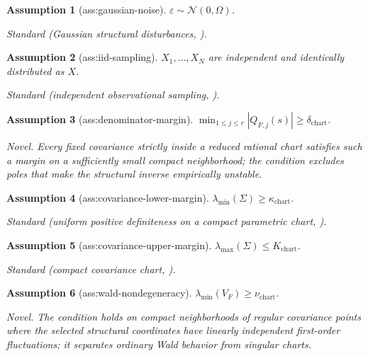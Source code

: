 \documentclass{article}
\newtheorem{assumption}{Assumption}
\begin{document}
\begin{assumption}[ass:gaussian-noise]\label{ass:gaussian-noise}
\(\varepsilon\sim\mathcal N(0,\Omega)\).
\par\smallskip\noindent\emph{Standard} (Gaussian structural disturbances, \cite{FoygelDraismaDrton2012}).
\end{assumption}

\begin{assumption}[ass:iid-sampling]\label{ass:iid-sampling}
\(X_1,\ldots,X_N\) are independent and identically distributed as \(X\).
\par\smallskip\noindent\emph{Standard} (independent observational sampling, \cite{MareisSturmaDrton2026}).
\end{assumption}

\begin{assumption}[ass:denominator-margin]\label{ass:denominator-margin}
\(\min_{1\le j\le r}|Q_{F,j}(s)|\ge\delta_{\mathrm{chart}}\).
\par\smallskip\noindent\emph{Novel.} Every fixed covariance strictly inside a reduced rational chart satisfies such a margin on a sufficiently small compact neighborhood; the condition excludes poles that make the structural inverse empirically unstable.
\end{assumption}

\begin{assumption}[ass:covariance-lower-margin]\label{ass:covariance-lower-margin}
\(\lambda_{\min}(\Sigma)\ge\kappa_{\mathrm{chart}}\).
\par\smallskip\noindent\emph{Standard} (uniform positive definiteness on a compact parametric chart, \cite{VanDerVaart1998}).
\end{assumption}

\begin{assumption}[ass:covariance-upper-margin]\label{ass:covariance-upper-margin}
\(\lambda_{\max}(\Sigma)\le K_{\mathrm{chart}}\).
\par\smallskip\noindent\emph{Standard} (compact covariance chart, \cite{VanDerVaart1998}).
\end{assumption}

\begin{assumption}[ass:wald-nondegeneracy]\label{ass:wald-nondegeneracy}
\(\lambda_{\min}(V_F)\ge\nu_{\mathrm{chart}}\).
\par\smallskip\noindent\emph{Novel.} The condition holds on compact neighborhoods of regular covariance points where the selected structural coordinates have linearly independent first-order fluctuations; it separates ordinary Wald behavior from singular charts.
\end{assumption}
\end{document}
